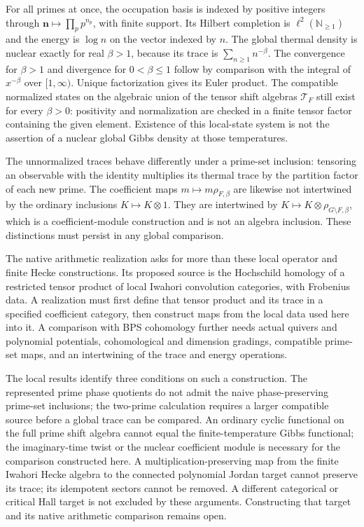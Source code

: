 For all primes at once, the occupation basis is indexed by positive
integers through $\mathbf n\mapsto\prod_p p^{n_p}$, with finite
support. Its Hilbert completion is $\ell^2(\mathbb N_{\geq1})$ and
the energy is $\log n$ on the vector indexed by $n$. The global
thermal density is nuclear exactly for real $\beta>1$, because
its trace is $\sum_{n\geq1}n^{-\beta}$. The convergence for
$\beta>1$ and divergence for $0<\beta\leq1$ follow by comparison
with the integral of $x^{-\beta}$ over $[1,\infty)$.
Unique factorization gives its Euler product. The compatible
normalized states on the algebraic union of the tensor shift
algebras $\mathcal T_F$ still exist for every $\beta>0$: positivity and
normalization are checked in a finite tensor factor containing
the given element. Existence of this local-state system is not
the assertion of a nuclear global Gibbs density at those temperatures.

The unnormalized traces behave differently under a prime-set
inclusion: tensoring an observable with the identity multiplies
its thermal trace by the partition factor of each new prime.
The coefficient maps $m\mapsto m\rho_{F,\beta}$ are likewise not
intertwined by the ordinary inclusions $K\mapsto K\otimes1$.
They are intertwined by $K\mapsto K\otimes\rho_{G\setminus F,\beta}$,
which is a coefficient-module construction and is not an algebra
inclusion. These distinctions must persist in any global comparison.

The native arithmetic realization asks for more than these local
operator and finite Hecke constructions. Its proposed source is
the Hochschild homology of a restricted tensor product of local
Iwahori convolution categories, with Frobenius data. A realization
must first define that tensor product and its trace in a specified
coefficient category, then construct maps from the local data
used here into it. A comparison with BPS cohomology further needs
actual quivers and polynomial potentials, cohomological and
dimension gradings, compatible prime-set maps, and an intertwining
of the trace and energy operations.

The local results identify three conditions on such a construction.
The represented prime phase quotients do not admit the naive
phase-preserving prime-set inclusions; the two-prime calculation
requires a larger compatible source before a global trace can
be compared.
An ordinary cyclic functional on the full prime shift algebra
cannot equal the finite-temperature Gibbs functional; the
imaginary-time twist or the nuclear coefficient module is necessary
for the comparison constructed here. A multiplication-preserving
map from the finite Iwahori Hecke algebra to the connected
polynomial Jordan target cannot preserve its trace; its idempotent
sectors cannot be removed. A different categorical or critical
Hall target is not excluded by these arguments. Constructing that
target and its native arithmetic comparison remains open.

